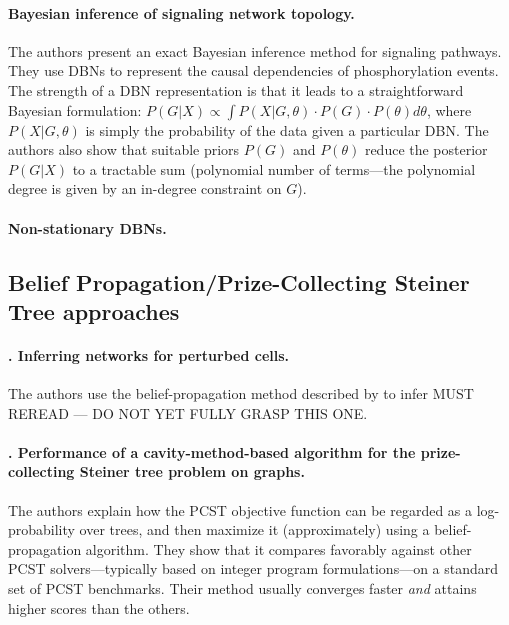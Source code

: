 \documentclass[14pt]{article}
\begin{document}
\paragraph{ \citet{hill-bayesian-2012} Bayesian inference of signaling network topology.}
The authors present an exact Bayesian inference method for signaling pathways.
They use DBNs to represent the causal dependencies of phosphorylation events.
The strength of a DBN representation is that it leads to a straightforward Bayesian formulation:
$P(G|X) \propto \int P(X|G, \theta) \cdot P(G) \cdot P(\theta) d\theta$, where $P(X|G, \theta)$ is
simply the probability of the data given a particular DBN.
The authors also show that suitable priors $P(G)$ and $P(\theta)$ reduce the posterior $P(G|X)$
to a tractable sum (polynomial number of terms---the polynomial degree is given by an in-degree constraint on $G$).

\paragraph{ \citet{2010-robinson-nsdbn} Non-stationary DBNs.}

\subsection{Belief Propagation/Prize-Collecting Steiner Tree approaches}

\paragraph{ \citet{2013-molinelli-perturbation}. Inferring networks for perturbed cells.}
The authors use the belief-propagation method described by \citeauthor{2012-biazzo-steiner} to infer 
MUST REREAD --- DO NOT YET FULLY GRASP THIS ONE.

\paragraph{ \citet{2012-biazzo-steiner}. Performance of a cavity-method-based algorithm for the prize-collecting Steiner tree problem on graphs.}
The authors explain how the PCST objective function can be regarded as a log-probability over trees, and then maximize it (approximately) using a belief-propagation algorithm.
They show that it compares favorably against other PCST solvers---typically based on integer program formulations---on a standard set of PCST benchmarks.
Their method usually converges faster \emph{and} attains higher scores than the others.
\end{document}
